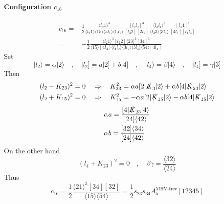 \paragraph{Configuration $c_{16}$}
\begin{equation*}
\begin{split}
c_{16} = & \frac{1}{2}
\frac{\langle l_2 1 \rangle^4}{\langle l_2 1 \rangle\langle 15 \rangle\langle 5 l_1 \rangle\langle l_1 l_2\rangle}
\frac{[l_2 l_3]^3}{[l_3 2 ][2 l_2]}
\frac{\langle l_3 l_4\rangle^3}{\langle l_3 3\rangle\langle 3 l_4\rangle}
\frac{[l_4 4 ]^3}{[4l_1][l_1l_4]}
\\
= & 
-\frac{1}{2}\frac{\langle l_2 1\rangle^3[l_2 2 ]\langle 23 \rangle^3[34]^3}{\langle 15 \rangle[4l_4]\langle l_4 l_2\rangle\langle 3l_2\rangle \langle 3 l_4\rangle\langle 54\rangle[4l_4]}
\end{split}
\end{equation*}
Set
\begin{equation*}
|l_2\rangle = \alpha|2\rangle \quad,\quad
|l_2] = a|2] + b|4] \quad,\quad
|l_4\rangle = \beta |4\rangle \quad,\quad
|l_4] = \gamma|3]
\end{equation*}
Then
\begin{equation*}
\begin{split}
& (l_2 - K_{23})^2 = 0 \quad\Rightarrow\quad K_{23}^2 = \alpha a [2|\slashed{K}_3|2\rangle + \alpha b [4|\slashed{K}_{23}|2\rangle
\\
& (l_2 + K_{15})^2 = 0 \quad\Rightarrow\quad K_{15}^2 = -\alpha a [2|\slashed{K}_{15}|2\rangle - \alpha b [4|\slashed{K}_{15}|2\rangle
\end{split}
\end{equation*}
\begin{equation*}
\begin{split}
& \alpha a = \frac{[4|\slashed{K}_{23}|4\rangle}{[24]\langle 42\rangle}
\\
& \alpha b = \frac{[32]\langle 34\rangle}{[24]\langle 42\rangle}
\end{split}
\end{equation*}
On the other hand
\begin{equation*}
(l_4 + K_{23})^2 = 0 \quad,\quad \beta\gamma = \frac{\langle 32\rangle}{\langle 24\rangle}
\end{equation*}
Thus
\begin{equation*}
c_{16}= \frac{1}{2}\frac{\langle 21\rangle^3[34][32]}{\langle 15\rangle\langle 54\rangle} = \frac{1}{2}s_{23}s_{34}A_5^{\textrm{MHV-tree}}[12345]
\end{equation*}
